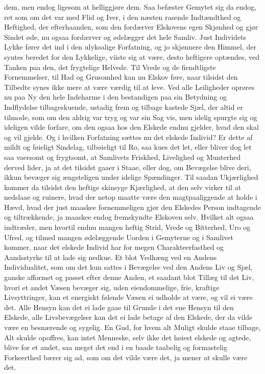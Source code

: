 \documentclass[12pt,a4paper]{book}
\newcommand{\apage}[1]{\marginnote{\footnotesize\textit{[#1]}}}
\begin{document}
dem, men endog ligesom at helliggjøre dem. Saa befæster Gemytet sig da
endog, ret som om det var med Flid og Iver, i den næsten rasende
Indtændthed og Heftighed, der efterhaanden, som den fordærver Elskovens
egen Skjønhed og gjør Sindet øde, nu ogsaa fordærver og ødelægger det
hele Samliv. Just Individets Lykke fører det ind i den ulyksalige
Forfatning, og jo skjønnere den Himmel, der syntes beredet for den
Lykkelige, viiste sig at være, desto heftigere optændes, ved Tanken paa
den, det frygtelige Helvede. Til Vrede og de fiendtligste Fornemmelser,
til Had og Grusomhed kan nu Elskov føre, naar tilsidst den Tilbedte
synes ikke mere at være værdig til at leve. Ved alle Leiligheder oprøres
nu paa Ny den hele Indeharme i den bestandigen paa sin Betydning og
Indflydelse tilbageskuende, ustadig frem og tilbage kastede Sjæl, der
altid er tilmode, som om den aldrig var tryg og var sin Sag vis, men
idelig spurgte sig og ideligen vilde forfare, om den ogsaa hos den
Elskede endnu gjelder, hvad den skal og vil gjelde. Og i hvilken
Forfatning sættes nu det elskede Individ? Er dette af mildt og føieligt
Sindelag, tilbøieligt til Ro, saa kues det let, eller bliver dog let saa
vaersomt og frygtsomt, at Samlivets Friskhed, Livelighed og Munterhed
derved lider, ja at det tilsidst gaaer i Staae, eller dog, om Bevægelse
blive deri, ikkun bevæger sig ængsteligen under idelige Spændinger. Til
saadan \apage{121} Ukjærlighed kommer da tilsidst den heftige skinsyge Kjærlighed,
at den selv virker til at nedslaae og ruinere, hvad der netop maatte
være den magtpaaliggende at holde i Hævd, hvad der just maaskee
fornemmeligen gjør den Elskedes Person indtagende og tiltrækkende, ja
maaskee endog fremskyndte Elskoven selv. Hvilket alt ogsaa indtræder,
men hvortil endnu mangen heftig Strid, Vrede og Bitterhed, Uro og Ufred,
og tilmed mangen ødelæggende Uorden i Gemyterne og i Samlivet kommer,
naar det elskede Individ har for megen Charakteerfasthed og Aandsstyrke
til at lade sig nedkue. Et blot Vedhæng ved en Andens Individualitet,
som om det kun sattes i Bevægelse ved den Andens Liv og Sjæl, ganske
afformet og passet efter denne Anden, et saadant blot Tillæg til det
Liv, hvori et andet Væsen bevæger sig, uden eiendommelige, frie, kraftige
Livsyttringer, kan et energiskt følende Væsen ei udholde at være, og vil
ei være det. Alle Hensyn kan det ei lade gaae til Grunde i det ene
Hensyn til den Elskede, alle Livsbevægelser kan det ei lade betage af
den Elskede, der da vilde være en besnærende og sygelig. En Gud, for
hvem alt Muligt skulde staae tilbage, Alt skulde opoffres, kan intet
Menneske, selv ikke det høiest elskede og agtede, blive for et andet,
saa meget det end i en baade taabelig og formastelig Forkeerthed bærer
sig ad, som om det vilde være det, ja mener at skulle være det.
\end{document}
